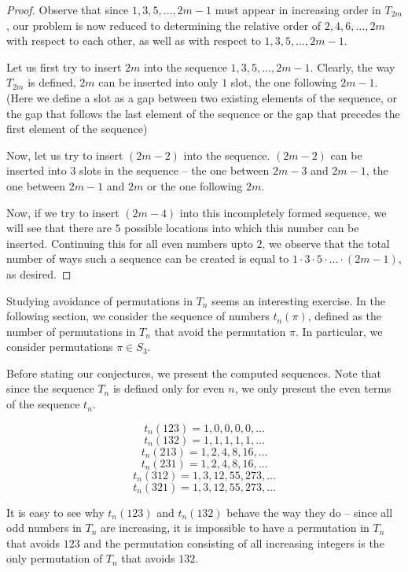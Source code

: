 \documentclass[11pt,letterpaper,twoside,english]{article}
\theoremstyle{theorem}
\theoremstyle{remark}
\begin{document}
\begin{proof}
Observe that since $1,3,5,\ldots,2m-1$ must appear in increasing order in $T_{2m}$, our problem is now reduced to determining the relative order of $2,4,6,\ldots,2m$ with respect to each other, as well as with respect to $1,3,5,\ldots,2m-1$.

Let us first try to insert $2m$ into the sequence $1,3,5,\ldots,2m-1$. Clearly, the way $T_{2m}$ is defined, $2m$ can be inserted into only $1$ slot, the one following $2m-1$. (Here we define a slot as a gap between two existing elements of the sequence, or the gap that follows the last element of the sequence or the gap that precedes the first element of the sequence)

Now, let us try to insert $(2m-2)$ into the sequence. $(2m-2)$ can be inserted into $3$ slots in the sequence -- the one between $2m-3$ and $2m-1$, the one between $2m-1$ and $2m$ or the one following $2m$.

Now, if we try to insert $(2m-4)$ into this incompletely formed sequence, we will see that there are $5$ possible locations into which this number can be inserted. Continuing this for all even numbers upto $2$, we observe that the total number of ways such a sequence can  be created is equal to $1 \cdot 3 \cdot 5 \cdot \ldots \cdot (2m-1)$, as desired.
\end{proof}

Studying avoidance of permutations in $T_n$ seems an interesting exercise. In the following section, we consider the sequence of numbers $t_n(\pi)$, defined as the number of permutations in $T_n$ that avoid the permutation $\pi$. In particular, we consider permutations $\pi \in S_3$.

Before stating our conjectures, we present the computed sequences. Note that since the sequence $T_n$ is defined only for even $n$, we only present the even terms of the sequence $t_n$.

$$t_n(123) = 1, 0, 0, 0, 0, \ldots$$
$$t_n(132) = 1, 1, 1, 1, 1, \ldots$$
$$t_n(213) = 1, 2, 4, 8, 16, \ldots$$
$$t_n(231) = 1, 2, 4, 8, 16, \ldots$$
$$t_n(312) = 1, 3, 12, 55, 273, \ldots$$
$$t_n(321) = 1, 3, 12, 55, 273, \ldots$$

It is easy to see why $t_n(123)$ and $t_n(132)$ behave the way they do -- since all odd numbers in $T_n$ are increasing, it is impossible to have a permutation in $T_n$ that avoids $123$ and the permutation consisting of all increasing integers is the only permutation of $T_n$ that avoids $132$.
\end{document}
